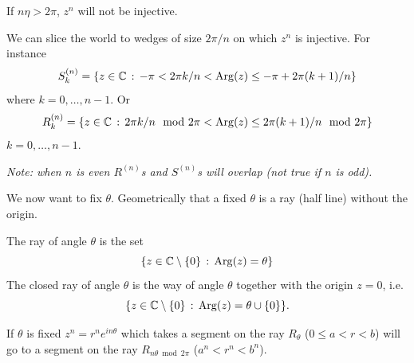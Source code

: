 \documentclass[10pt, a4paper]{article}
\begin{document}
If $n\eta > 2\pi$,
$z ^ n$ will not be injective.

We can slice the world to wedges of size $2\pi / n$ on which $z ^ n$ is injective.
For instance
\[
S_{k}^{(n)} = \{z \in \mathbb{C}\,:\,-\pi < 2\pi k / n < \operatorname{Arg}(z) \leq -\pi + 2\pi(k + 1) / n\}
\]
where $k = 0, \dotsc, n - 1$.
Or
\[
R_{k}^{(n)} = \{z \in \mathbb{C}\,:\, 2\pi k / n\mod{2\pi} < \operatorname{Arg}(z) \leq 2\pi(k + 1) / n\mod{2\pi}\}
\]
$k = 0, \dotsc, n - 1$.

\textit{Note:
when $n$ is even $R ^ {(n)}$s and $S ^ {(n)}$s will overlap
(not true if $n$ is odd).}

We now want to fix $\theta$.
Geometrically that a fixed $\theta$ is a ray
(half line)
without the origin.

The ray of angle $\theta$ is the set
\[
\{z \in \mathbb{C} \setminus \{0\}\,:\,\operatorname{Arg}(z) = \theta\}
\]
The closed ray of angle $\theta$ is the way of angle $\theta$ together with the origin $z = 0$,
i.e.
\[
\{z \in \mathbb{C} \setminus \{0\}\,:\,\operatorname{Arg}(z) = \theta \cup \{0\}\}.
\]

If $\theta$ is fixed $z ^ n = r ^ ne ^ {in\theta}$ which takes a segment on the ray $R_{\theta}$
($0 \leq a < r < b$)
will go to a segment on the ray $R_{n\theta\bmod{2\pi}}$
($a ^ n < r ^ n < b ^ n$).
\end{document}
